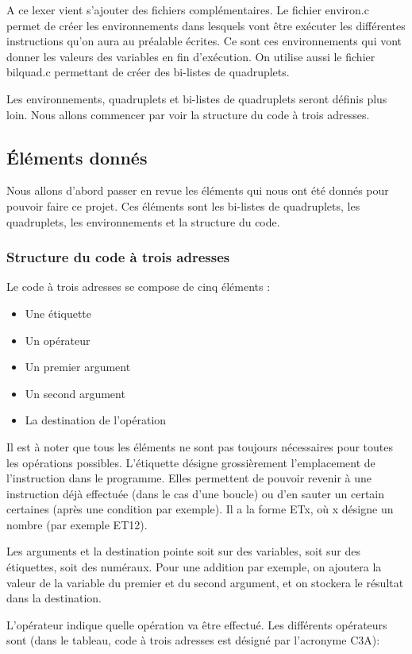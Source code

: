 \documentclass{article}
\begin{document}
A ce lexer vient s'ajouter des fichiers complémentaires. Le fichier environ.c permet de créer les environnements dans lesquels vont être exécuter les différentes instructions qu'on aura au préalable écrites. Ce sont ces environnements qui vont donner les valeurs des variables en fin d'exécution.
On utilise aussi le fichier bilquad.c permettant de créer des bi-listes de quadruplets.

Les environnements, quadruplets et bi-listes de quadruplets seront définis plus loin. Nous allons commencer par voir la structure du code à trois adresses.


\subsection{Éléments donnés}
Nous allons d'abord passer en revue les éléments qui nous ont été donnés pour pouvoir faire ce projet. Ces éléments sont les bi-listes de quadruplets, les quadruplets, les environnements et la structure du code.
\subsubsection{Structure du code à trois adresses}

Le code à trois adresses se compose de cinq éléments :
\begin{itemize}
\item Une étiquette
\item Un opérateur
\item Un premier argument
\item Un second argument
\item La destination de l’opération
\end{itemize}

Il est à noter que tous les éléments ne sont pas toujours nécessaires pour toutes les opérations possibles.
\medbreak
L'étiquette désigne grossièrement l'emplacement de l'instruction dans le programme. Elles permettent de pouvoir revenir à une instruction déjà effectuée (dans le cas d'une boucle) ou d'en sauter un certain certaines (après une condition par exemple). Il a la forme ETx, où x désigne un nombre (par exemple ET12).

Les arguments et la destination pointe soit sur des variables, soit sur des étiquettes, soit des numéraux. Pour une addition par exemple, on ajoutera la valeur de la variable du premier et du second argument, et on stockera le résultat dans la destination.

L'opérateur indique quelle opération va être effectué. Les différents opérateurs sont (dans le tableau, code à trois adresses est désigné par l'acronyme C3A):
\end{document}
